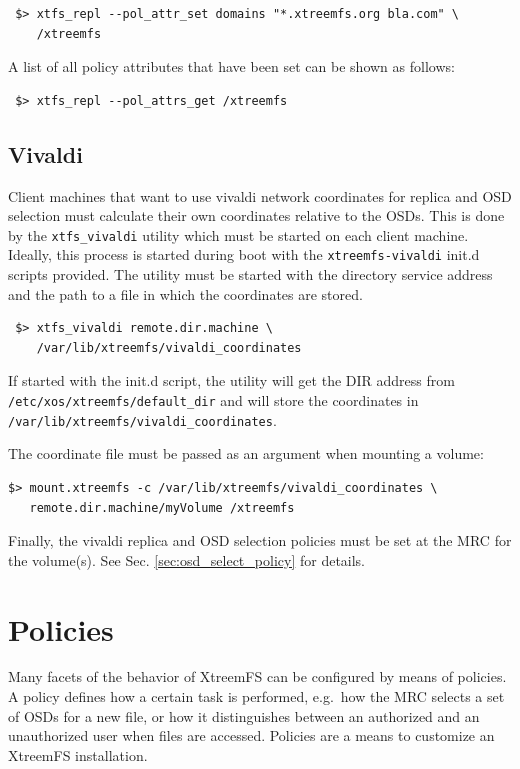 \documentclass[a4paper,10pt]{book}
\begin{document}
\begin{verbatim}
 $> xtfs_repl --pol_attr_set domains "*.xtreemfs.org bla.com" \
    /xtreemfs
\end{verbatim}

A list of all policy attributes that have been set can be shown as follows:

\begin{verbatim}
 $> xtfs_repl --pol_attrs_get /xtreemfs
\end{verbatim}

\section{Vivaldi}
\label{sec:vivaldi}
Client machines that want to use vivaldi network coordinates for replica and OSD selection must calculate their own coordinates relative to the OSDs. This is done by the \texttt{xtfs\_vivaldi} utility which must be started on each client machine. Ideally, this process is started during boot with the \texttt{xtreemfs-vivaldi} init.d scripts provided. The utility must be started with the directory service address and the path to a file in which the coordinates are stored.

\begin{verbatim}
 $> xtfs_vivaldi remote.dir.machine \
    /var/lib/xtreemfs/vivaldi_coordinates
\end{verbatim}

If started with the init.d script, the utility will get the DIR address from\\ \texttt{/etc/xos/xtreemfs/default\_dir} and will store the coordinates in\\ \texttt{/var/lib/xtreemfs/vivaldi\_coordinates}.

The coordinate file must be passed as an argument when mounting a volume:

\begin{verbatim}
$> mount.xtreemfs -c /var/lib/xtreemfs/vivaldi_coordinates \
   remote.dir.machine/myVolume /xtreemfs
\end{verbatim}

Finally, the vivaldi replica and OSD selection policies must be set at the MRC for the volume(s). See Sec. \ref{sec:osd_select_policy} for details.

\chapter{Policies}
Many facets of the behavior of XtreemFS can be configured by means of policies. A policy defines how a certain task is performed, e.g.\ how the MRC selects a set of OSDs for a new file, or how it distinguishes between an authorized and an unauthorized user when files are accessed. Policies are a means to customize an XtreemFS installation.
\end{document}
